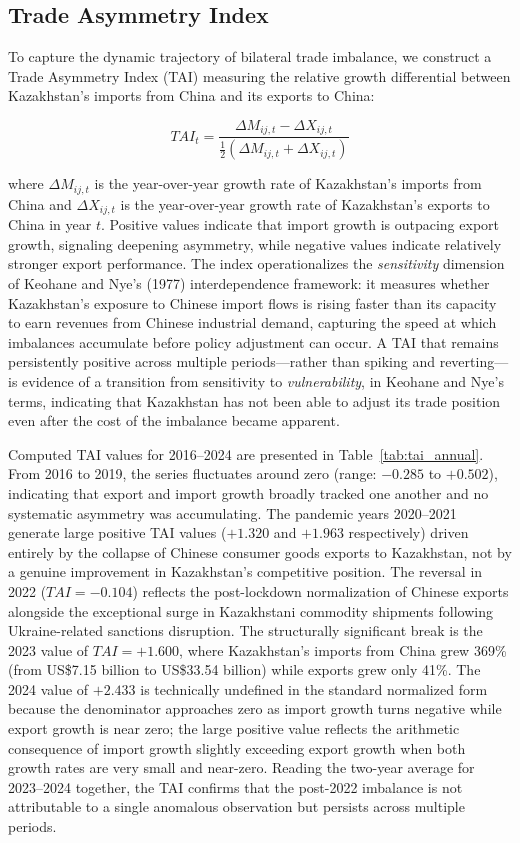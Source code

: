 \documentclass[12pt]{article}
\begin{document}
\subsection{Trade Asymmetry Index}

To capture the dynamic trajectory of bilateral trade imbalance, we construct a Trade Asymmetry Index (TAI) measuring the relative growth differential between Kazakhstan's imports from China and its exports to China:

\begin{equation}
TAI_t = \frac{\Delta M_{ij,t} - \Delta X_{ij,t}}{\frac{1}{2}(\Delta M_{ij,t} + \Delta X_{ij,t})}
\end{equation}

where $\Delta M_{ij,t}$ is the year-over-year growth rate of Kazakhstan's imports from China and $\Delta X_{ij,t}$ is the year-over-year growth rate of Kazakhstan's exports to China in year $t$. Positive values indicate that import growth is outpacing export growth, signaling deepening asymmetry, while negative values indicate relatively stronger export performance. The index operationalizes the \textit{sensitivity} dimension of Keohane and Nye's (1977) interdependence framework: it measures whether Kazakhstan's exposure to Chinese import flows is rising faster than its capacity to earn revenues from Chinese industrial demand, capturing the speed at which imbalances accumulate before policy adjustment can occur. A TAI that remains persistently positive across multiple periods---rather than spiking and reverting---is evidence of a transition from sensitivity to \textit{vulnerability}, in Keohane and Nye's terms, indicating that Kazakhstan has not been able to adjust its trade position even after the cost of the imbalance became apparent.

Computed TAI values for 2016--2024 are presented in Table~\ref{tab:tai_annual}. From 2016 to 2019, the series fluctuates around zero (range: $-0.285$ to $+0.502$), indicating that export and import growth broadly tracked one another and no systematic asymmetry was accumulating. The pandemic years 2020--2021 generate large positive TAI values ($+1.320$ and $+1.963$ respectively) driven entirely by the collapse of Chinese consumer goods exports to Kazakhstan, not by a genuine improvement in Kazakhstan's competitive position. The reversal in 2022 ($TAI = -0.104$) reflects the post-lockdown normalization of Chinese exports alongside the exceptional surge in Kazakhstani commodity shipments following Ukraine-related sanctions disruption. The structurally significant break is the 2023 value of $TAI = +1.600$, where Kazakhstan's imports from China grew 369\% (from US\$7.15 billion to US\$33.54 billion) while exports grew only 41\%. The 2024 value of $+2.433$ is technically undefined in the standard normalized form because the denominator approaches zero as import growth turns negative while export growth is near zero; the large positive value reflects the arithmetic consequence of import growth slightly exceeding export growth when both growth rates are very small and near-zero. Reading the two-year average for 2023--2024 together, the TAI confirms that the post-2022 imbalance is not attributable to a single anomalous observation but persists across multiple periods.
\end{document}
